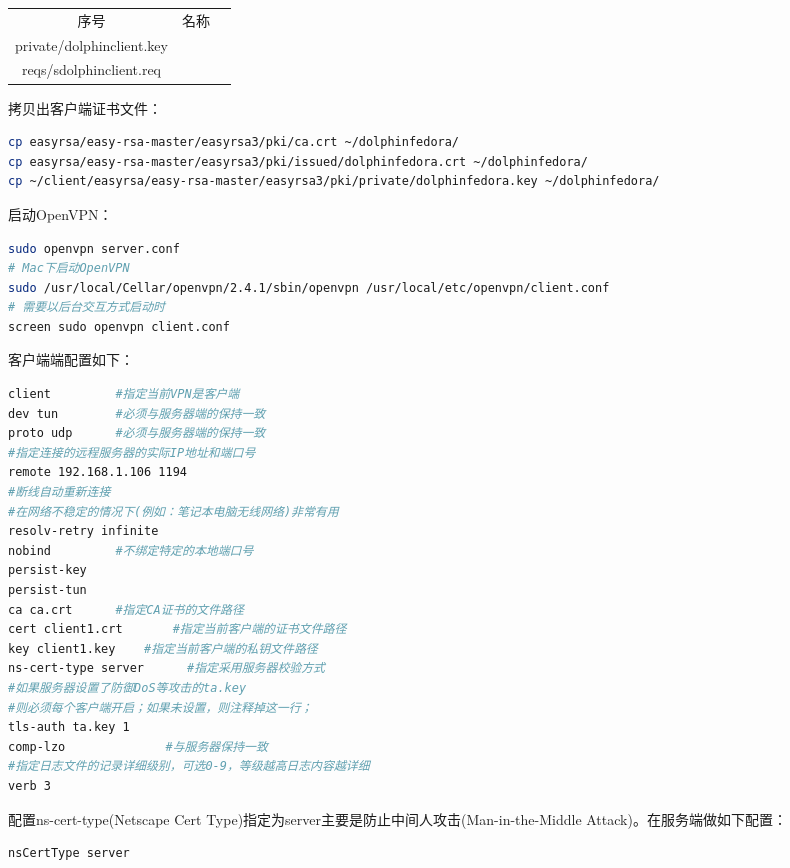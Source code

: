 \documentclass[12pt]{book}
\numberwithin{dummy}{section}
\theoremstyle{ocrenumbox}
\theoremstyle{blacknumex}
\theoremstyle{blacknumbox}
\theoremstyle{ocrenum}
\begin{document}
\begin{tabular}{|c|p{8cm}|c|}
	\hline
	\multirow{1}{*}{序号}
	& \multicolumn{1}{c|}{名称}  \\			
	\cline{1-2}
	private/dolphinclient.key  & \\
	\hline
	reqs/sdolphinclient.req & \\
	\hline
\end{tabular}

拷贝出客户端证书文件：

\begin{lstlisting}[language=Bash]
cp easyrsa/easy-rsa-master/easyrsa3/pki/ca.crt ~/dolphinfedora/
cp easyrsa/easy-rsa-master/easyrsa3/pki/issued/dolphinfedora.crt ~/dolphinfedora/
cp ~/client/easyrsa/easy-rsa-master/easyrsa3/pki/private/dolphinfedora.key ~/dolphinfedora/
\end{lstlisting}


启动OpenVPN：

\begin{lstlisting}[language=Bash]
sudo openvpn server.conf
# Mac下启动OpenVPN
sudo /usr/local/Cellar/openvpn/2.4.1/sbin/openvpn /usr/local/etc/openvpn/client.conf
# 需要以后台交互方式启动时
screen sudo openvpn client.conf
\end{lstlisting}

客户端端配置如下：

\begin{lstlisting}[language=Bash]
client         #指定当前VPN是客户端
dev tun        #必须与服务器端的保持一致
proto udp      #必须与服务器端的保持一致
#指定连接的远程服务器的实际IP地址和端口号
remote 192.168.1.106 1194      
#断线自动重新连接
#在网络不稳定的情况下(例如：笔记本电脑无线网络)非常有用
resolv-retry infinite
nobind         #不绑定特定的本地端口号
persist-key
persist-tun
ca ca.crt      #指定CA证书的文件路径
cert client1.crt       #指定当前客户端的证书文件路径
key client1.key    #指定当前客户端的私钥文件路径
ns-cert-type server      #指定采用服务器校验方式
#如果服务器设置了防御DoS等攻击的ta.key
#则必须每个客户端开启；如果未设置，则注释掉这一行；
tls-auth ta.key 1     
comp-lzo              #与服务器保持一致
#指定日志文件的记录详细级别，可选0-9，等级越高日志内容越详细
verb 3                
\end{lstlisting}

配置ns-cert-type(Netscape Cert Type)指定为server主要是防止中间人攻击(Man-in-the-Middle Attack)。在服务端做如下配置：

\begin{lstlisting}[language=Bash]
nsCertType server
\end{lstlisting}
\end{document}

